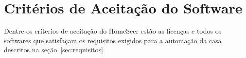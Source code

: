 \section{Critérios de Aceitação do Software}
	Dentre os críterios de aceitação do HomeSeer estão as licenças e todos os softwares que satisfaçam os requisitos
	exigidos para a automação da casa descritos na seção~\ref{sec:requisitos}.
